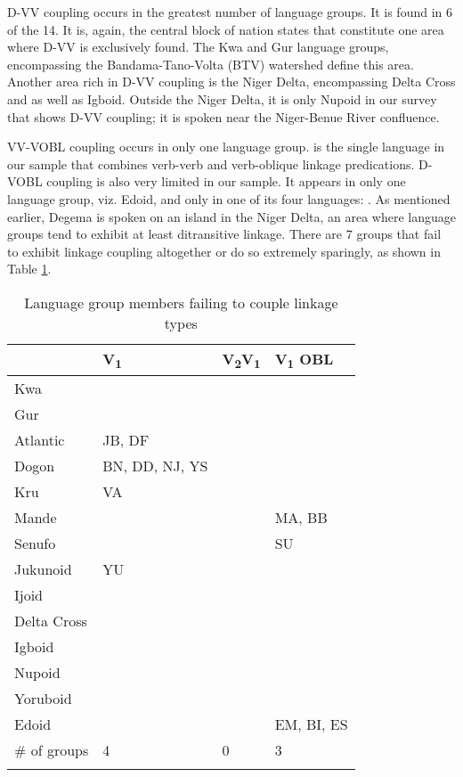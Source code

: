 \documentclass[output=paper,colorlinks,citecolor=brown]{langscibook}
\begin{document}
D-VV coupling occurs in the greatest number of language groups. It is found in 6 of the 14. It is, again, the central block of nation states that constitute one area where D-VV is exclusively found. The Kwa and Gur language groups, encompassing the Bandama-Tano-Volta (BTV) watershed define this area. Another area rich in D-VV coupling is the Niger Delta, encompassing  Delta Cross and  as well as Igboid. Outside the Niger Delta, it is only Nupoid in our survey that shows D-VV coupling; it is spoken near the Niger-Benue River confluence.

VV-VOBL coupling occurs in only one language group.  is the single language in our sample that combines verb-verb and verb-oblique linkage predications. D-VOBL coupling is also very limited in our sample. It appears in only one language group, viz.  Edoid, and only in one of its four languages: . As mentioned earlier, Degema is spoken on an island in the Niger Delta, an area where language groups tend to exhibit at least ditransitive linkage. There are 7 groups that fail to exhibit linkage coupling altogether or do so extremely sparingly, as shown in Table \ref{tab:LinkageFail}.

\begin{table}
\caption{Language group members failing to couple linkage types}
\label{tab:LinkageFail}
 \begin{tabular}{llll}
  \lsptoprule
 & V\textsubscript{1} & V\textsubscript{2}V\textsubscript{1} & V\textsubscript{1} OBL \\
\midrule
Kwa	&  		& & \\
Gur &		&& \\
Atlantic 		& JB, DF&& \\	
Dogon 			& BN, DD, NJ, YS&&\\
Kru 			& VA&&\\
Mande			& && MA, BB\\
Senufo			&&&SU \\
Jukunoid			&YU &&\\
Ijoid &			 && \\
Delta Cross &			&& \\
Igboid & 		&& \\
Nupoid	&		&& \\
Yoruboid & &		& \\
Edoid 	& & &	EM, BI, ES\\
\midrule
\# of groups &	4	&0&	3\\
  \lspbottomrule
 \end{tabular}
\end{table}
\end{document}
